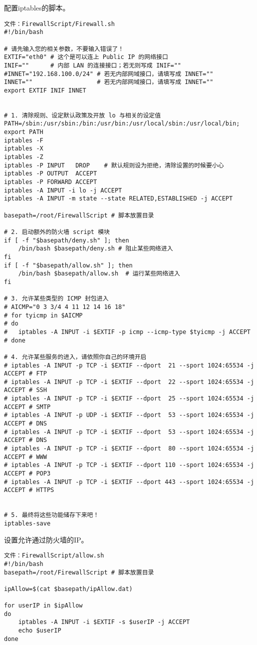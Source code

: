 配置iptables的脚本。
\begin{Verbatim}[]
文件：FirewallScript/Firewall.sh
#!/bin/bash

# 请先输入您的相关参数，不要输入错误了！
EXTIF="eth0" # 这个是可以连上 Public IP 的网络接口
INIF=""      # 内部 LAN 的连接接口；若无则写成 INIF=""
#INNET="192.168.100.0/24" # 若无内部网域接口，请填写成 INNET=""
INNET=""				  # 若无内部网域接口，请填写成 INNET=""
export EXTIF INIF INNET


# 1. 清除规则、设定默认政策及开放 lo 与相关的设定值
PATH=/sbin:/usr/sbin:/bin:/usr/bin:/usr/local/sbin:/usr/local/bin; export PATH
iptables -F
iptables -X
iptables -Z
iptables -P INPUT   DROP	# 默认规则设为拒绝，清除设置的时候要小心
iptables -P OUTPUT  ACCEPT
iptables -P FORWARD ACCEPT
iptables -A INPUT -i lo -j ACCEPT
iptables -A INPUT -m state --state RELATED,ESTABLISHED -j ACCEPT

basepath=/root/FirewallScript # 脚本放置目录

# 2. 启动额外的防火墙 script 模块
if [ -f "$basepath/deny.sh" ]; then
	/bin/bash $basepath/deny.sh	# 阻止某些网络进入
fi
if [ -f "$basepath/allow.sh" ]; then
	/bin/bash $basepath/allow.sh  # 运行某些网络进入
fi

# 3. 允许某些类型的 ICMP 封包进入
# AICMP="0 3 3/4 4 11 12 14 16 18"
# for tyicmp in $AICMP
# do
# 	iptables -A INPUT -i $EXTIF -p icmp --icmp-type $tyicmp -j ACCEPT
# done

# 4. 允许某些服务的进入，请依照你自己的环境开启
# iptables -A INPUT -p TCP -i $EXTIF --dport  21 --sport 1024:65534 -j ACCEPT # FTP
# iptables -A INPUT -p TCP -i $EXTIF --dport  22 --sport 1024:65534 -j ACCEPT # SSH
# iptables -A INPUT -p TCP -i $EXTIF --dport  25 --sport 1024:65534 -j ACCEPT # SMTP
# iptables -A INPUT -p UDP -i $EXTIF --dport  53 --sport 1024:65534 -j ACCEPT # DNS
# iptables -A INPUT -p TCP -i $EXTIF --dport  53 --sport 1024:65534 -j ACCEPT # DNS
# iptables -A INPUT -p TCP -i $EXTIF --dport  80 --sport 1024:65534 -j ACCEPT # WWW
# iptables -A INPUT -p TCP -i $EXTIF --dport 110 --sport 1024:65534 -j ACCEPT # POP3
# iptables -A INPUT -p TCP -i $EXTIF --dport 443 --sport 1024:65534 -j ACCEPT # HTTPS


# 5. 最终将这些功能储存下来吧！
iptables-save
\end{Verbatim}

设置允许通过防火墙的IP。
\begin{Verbatim}[]
文件：FirewallScript/allow.sh
#!/bin/bash
basepath=/root/FirewallScript # 脚本放置目录

ipAllow=$(cat $basepath/ipAllow.dat)

for userIP in $ipAllow
do
	iptables -A INPUT -i $EXTIF -s $userIP -j ACCEPT
	echo $userIP
done
\end{Verbatim}

